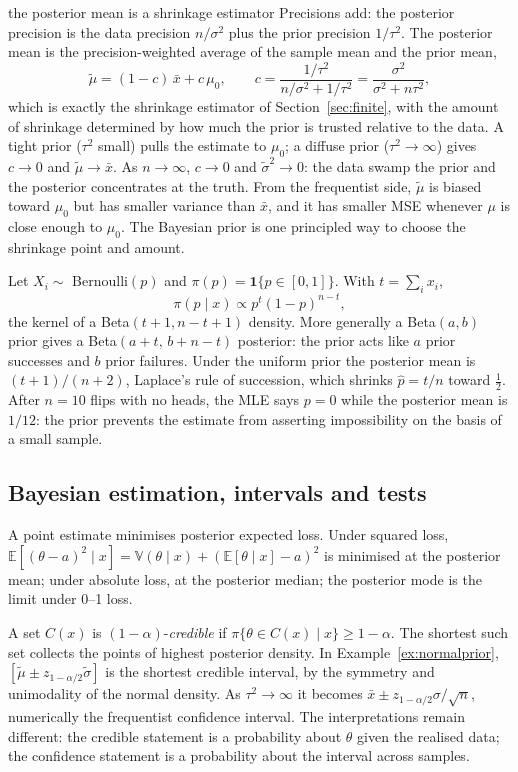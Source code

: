 \documentclass[11pt,a4paper]{article}
\newcommand{\E}{\mathbb{E}}
\newcommand{\V}{\mathbb{V}}
\newcommand{\one}{\mathbf 1}
\begin{document}
\begin{whybox}{the posterior mean is a shrinkage estimator}
Precisions add: the posterior precision is the data precision $n/\sigma^2$ plus the prior precision $1/\tau^2$. The posterior mean is the precision-weighted average of the sample mean and the prior mean,
\[
\tilde\mu=(1-c)\,\bar x+c\,\mu_0,\qquad c=\frac{1/\tau^2}{n/\sigma^2+1/\tau^2}=\frac{\sigma^2}{\sigma^2+n\tau^2},
\]
which is exactly the shrinkage estimator of Section~\ref{sec:finite}, with the amount of shrinkage determined by how much the prior is trusted relative to the data. A tight prior ($\tau^2$ small) pulls the estimate to $\mu_0$; a diffuse prior ($\tau^2\to\infty$) gives $c\to0$ and $\tilde\mu\to\bar x$. As $n\to\infty$, $c\to0$ and $\tilde\sigma^2\to0$: the data swamp the prior and the posterior concentrates at the truth. From the frequentist side, $\tilde\mu$ is biased toward $\mu_0$ but has smaller variance than $\bar x$, and it has smaller MSE whenever $\mu$ is close enough to $\mu_0$. The Bayesian prior is one principled way to choose the shrinkage point and amount.
\end{whybox}

\begin{example}
Let $X_i\sim$ Bernoulli$(p)$ and $\pi(p)=\one\{p\in[0,1]\}$. With $t=\sum_ix_i$,
\[
\pi(p\mid x)\propto p^{t}(1-p)^{n-t},
\]
the kernel of a Beta$(t+1,n-t+1)$ density. More generally a Beta$(a,b)$ prior gives a Beta$(a+t,\,b+n-t)$ posterior: the prior acts like $a$ prior successes and $b$ prior failures. Under the uniform prior the posterior mean is $(t+1)/(n+2)$, Laplace's rule of succession, which shrinks $\hat p=t/n$ toward $\frac12$. After $n=10$ flips with no heads, the MLE says $p=0$ while the posterior mean is $1/12$: the prior prevents the estimate from asserting impossibility on the basis of a small sample.
\end{example}

\subsection{Bayesian estimation, intervals and tests}

A point estimate minimises posterior expected loss. Under squared loss, $\E[(\theta-a)^2\mid x]=\V(\theta\mid x)+(\E[\theta\mid x]-a)^2$ is minimised at the posterior mean; under absolute loss, at the posterior median; the posterior mode is the limit under 0--1 loss.

A set $C(x)$ is $(1-\alpha)$-\emph{credible} if $\pi\{\theta\in C(x)\mid x\}\ge1-\alpha$. The shortest such set collects the points of highest posterior density. In Example~\ref{ex:normalprior}, $[\tilde\mu\pm z_{1-\alpha/2}\tilde\sigma]$ is the shortest credible interval, by the symmetry and unimodality of the normal density. As $\tau^2\to\infty$ it becomes $\bar x\pm z_{1-\alpha/2}\sigma/\sqrt n$, numerically the frequentist confidence interval. The interpretations remain different: the credible statement is a probability about $\theta$ given the realised data; the confidence statement is a probability about the interval across samples.
\end{document}
